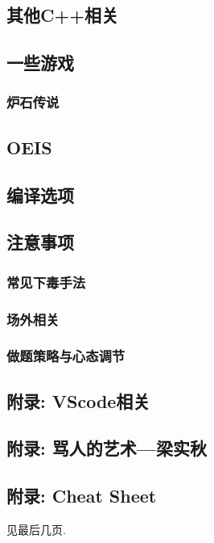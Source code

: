 \documentclass[a4paper, twoside]{article}
\begin{document}
\begin{multicols}{2}
			\subsection{其他C++相关}
				
			
			\subsection{一些游戏}
				\subsubsection{炉石传说}
					

			\subsection{OEIS}
				\label{oeis}
				
			
			\subsection{编译选项}
				
				
			\subsection{注意事项}

				\subsubsection{常见下毒手法}
					

				\subsubsection{场外相关}
					

				\subsubsection{做题策略与心态调节}
					
			
			\subsection{附录: VScode相关}
				
			
			\newpage
			\subsection{附录: 骂人的艺术—梁实秋}
				
			
			\subsection{附录: Cheat Sheet}
				见最后几页.

	\end{multicols}

	

	\pagestyle{empty}

	\newpage

	\null

	\newpage

	\null
\end{document}
